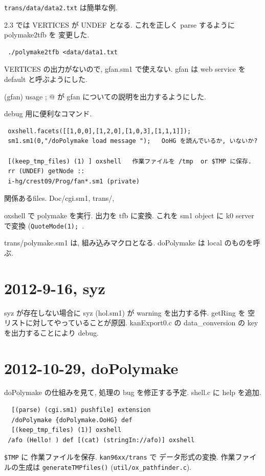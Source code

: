 \documentclass{jarticle}
\begin{document}
{\tt trans/data/data2.txt} は簡単な例.

2.3 では VERTICES が UNDEF となる. これを正しく parse するように polymake2tfb を
変更した.
\begin{verbatim}
 ./polymake2tfb <data/data1.txt
\end{verbatim}
VERTICES の出力がないので, gfan.sm1 で使えない.
gfan は web service を default と呼ぶようにした.

\verb@ (gfan) usage ; @ が gfan についての説明を出力するようにした.

debug 用に便利なコマンド.
\begin{verbatim}
 oxshell.facets([[1,0,0],[1,2,0],[1,0,3],[1,1,1]]); 
 sm1.sm1(0,"/doPolymake load message ");   OoHG を読んでいるか, いないか?

 [(keep_tmp_files) (1) ] oxshell   作業ファイルを /tmp  or $TMP に保存.
 rr (UNDEF) getNode ::
 i-hg/crest09/Prog/fan*.sm1 (private)
\end{verbatim}

関係あるfiles.
Doc/cgi.sm1, trans/, 

oxshell で polymake を実行. 出力を tfb に変換. これを sm1 object に
k0 server で変換 ({\tt QuoteMode(1); }.

trans/polymake.sm1 は, 組み込みマクロとなる.
doPolymake は local のものを呼ぶ.

\section{2012-9-16,  syz}

syz が存在しない場合に syz (hol.sm1) が warning を出力する件.
getRing を 空リストに対してやっていることが原因.
kanExport0.c の data\_conversion の key を出力することにより debug. 

\section{2012-10-29, doPolymake}

doPolymake の仕組みを見て, 処理の bug を修正する予定.
shell.c に help を追加.
\begin{verbatim}
  [(parse) (cgi.sm1) pushfile] extension
  /doPolymake {doPolymake.OoHG} def
  [(keep_tmp_files) (1)] oxshell
 /afo (Hello! ) def [(cat) (stringIn://afo)] oxshell
\end{verbatim}
{\tt \$TMP} に 作業ファイルを保存.
{\tt kan96xx/trans} で データ形式の変換.
作業ファイルの生成は 
{\tt generateTMPfiles()} ({\tt util/ox\_pathfinder.c}).
\end{document}
